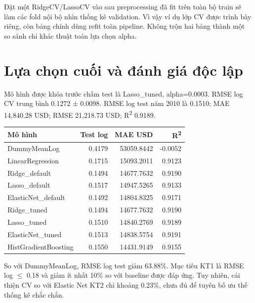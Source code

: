 \documentclass[12pt,a4paper]{article}
\begin{document}
Đặt một RidgeCV/LassoCV vào sau preprocessing đã fit trên toàn bộ train sẽ làm các fold nội bộ nhìn thống kê validation. Vì vậy ví dụ lớp CV được trình bày riêng, còn bảng chính dùng refit toàn pipeline. Không trộn hai bảng thành một so sánh chỉ khác thuật toán lựa chọn alpha.


\clearpage\section{Lựa chọn cuối và đánh giá độc lập}

Mô hình được khóa trước chấm test là Lasso\_tuned, alpha=0.0003. RMSE log CV trung bình 0.1272 ± 0.0098. RMSE log test năm 2010 là 0.1510; MAE 14,840.28 USD; RMSE 21,218.73 USD; R\textsuperscript{2} 0.9189.


\begingroup\small\setlength{\tabcolsep}{4pt}\begin{tabularx}{\linewidth}{@{}Yrrr@{}}\toprule

\textbf{Mô hình} & \textbf{Test log} & \textbf{MAE USD} & \textbf{R\textsuperscript{2}}\\\midrule

DummyMeanLog & 0.4179 & 53059.8442 & -0.0052\\

LinearRegression & 0.1715 & 15093.2011 & 0.9123\\

Ridge\_default & 0.1494 & 14677.7632 & 0.9190\\

Lasso\_default & 0.1517 & 14947.5265 & 0.9133\\

ElasticNet\_default & 0.1492 & 14804.8325 & 0.9171\\

Ridge\_tuned & 0.1494 & 14677.7632 & 0.9190\\

Lasso\_tuned & 0.1510 & 14840.2769 & 0.9189\\

ElasticNet\_tuned & 0.1513 & 14838.5754 & 0.9191\\

HistGradientBoosting & 0.1550 & 14431.9149 & 0.9155\\

\bottomrule\end{tabularx}\endgroup\par

So với DummyMeanLog, RMSE log test giảm 63.88\%. Mục tiêu KT1 là RMSE log \ensuremath{\leq} 0.18 và giảm ít nhất 10\% so với baseline được đáp ứng. Tuy nhiên, cải thiện CV so với Elastic Net KT2 chỉ khoảng 0.23\%, chưa đủ để tuyên bố ưu thế thống kê chắc chắn.
\end{document}
